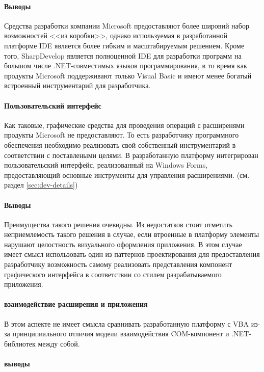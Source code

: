 
\paragraph{Выводы}

Средства разработки компании Microsoft предоставляют более шировий набор возможностей <<из коробки>>, однако используемая в разработанной платформе IDE является более гибким и масштабируемым решением. Кроме того, SharpDevelop является полноценной IDE для разработки программ на большом числе .NET-совместимых языков программирования, в то время как продукты Microsoft поддерживают только Visual Basic и имеют менее богатый встроенный инструментарий для разработчика.

\paragraph{Пользовательский интерфейс}

Как таковые, графические средства для проведения операций с расширенями продукты Microsoft не предоставляют. То есть разработчику программного обеспечения необходимо реализовать свой собственный инструментарий в соответствии с поставлеными целями. В разработанную платформу интегрирован пользовательский интерфейс, реализованный на Windows Forms, предоставляющий основные инструменты для управления расширениями. (см. раздел \ref{sec:dev-details}) 

\paragraph{Выводы}

Преимущества такого решения очевидны. Из недостатков стоит отметить неприемлемость такого решения в случае, если втроенные в платформу элементы нарушают целостность визуального оформления приложения. В этом случае имеет смысл использовать один из паттернов проектирования для предоставления разработчику возможность самому реализовать представления компонент графического интерфейса в соответствии со стилем разрабатываемого приложения.

\paragraph{взаимодействие расширения и приложения}

В этом аспекте не имеет смысла сравнивать разработанную платформу с VBA из-за принципиального отличия модели взаимодействия COM-компонент и .NET-библиотек между собой.

\paragraph{выводы}


\pagebreak
